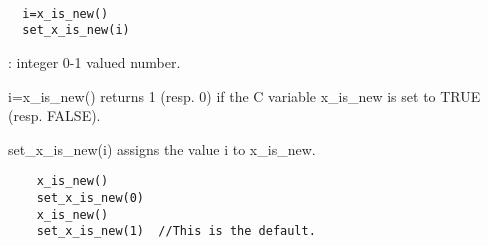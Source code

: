 
\begin{mandesc}
  \\ %
\end{mandesc}
\begin{calling_sequence}
\begin{verbatim}
  i=x_is_new()  
  set_x_is_new(i)  
\end{verbatim}
\end{calling_sequence}

\begin{parameters}
  \begin{varlist}
    : integer 0-1 valued number.
  \end{varlist}
\end{parameters}

\begin{mandescription}
  
  i=x\_is\_new() returns 1 (resp. 0) if the C variable x\_is\_new is set to 
  TRUE (resp. FALSE). 
  
  set\_x\_is\_new(i) assigns the value i to x\_is\_new.
  
\end{mandescription}

\begin{examples}
  \begin{Verbatim}
    x_is_new()
    set_x_is_new(0)
    x_is_new()
    set_x_is_new(1)  //This is the default. 
  \end{Verbatim}
\end{examples}

\begin{manseealso}
\end{manseealso}

